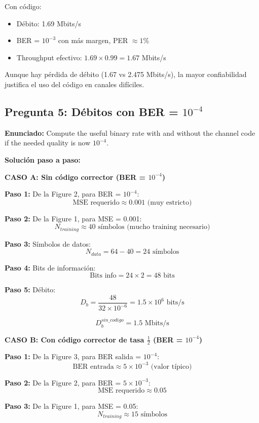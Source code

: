 \documentclass[11pt,a4paper]{article}
\begin{document}
Con c\'odigo:
\begin{itemize}
    \item D\'ebito: 1.69 Mbits/s
    \item BER = $10^{-3}$ con m\'as margen, PER $\approx 1\%$
    \item Throughput efectivo: $1.69 \times 0.99 = 1.67$ Mbits/s
\end{itemize}

Aunque hay p\'erdida de d\'ebito (1.67 vs 2.475 Mbits/s), la mayor confiabilidad justifica el uso del c\'odigo en canales dif\'iciles.



\subsection*{Pregunta 5: D\'ebitos con BER = $10^{-4}$}

\textbf{Enunciado:} Compute the useful binary rate with and without the channel code if the needed quality is now $10^{-4}$.

\vspace{0.3cm}
\textbf{Soluci\'on paso a paso:}

\textbf{CASO A: Sin c\'odigo corrector (BER = $10^{-4}$)}

\textbf{Paso 1:} De la Figure 2, para BER = $10^{-4}$:
\[
\text{MSE requerido} \approx 0.001 \text{ (muy estricto)}
\]

\textbf{Paso 2:} De la Figure 1, para MSE = 0.001:
\[
N_{training} \approx 40 \text{ s\'imbolos (mucho training necesario)}
\]

\textbf{Paso 3:} S\'imbolos de datos:
\[
N_{data} = 64 - 40 = 24 \text{ s\'imbolos}
\]

\textbf{Paso 4:} Bits de informaci\'on:
\[
\text{Bits info} = 24 \times 2 = 48 \text{ bits}
\]

\textbf{Paso 5:} D\'ebito:
\[
D_b = \frac{48}{32 \times 10^{-6}} = 1.5 \times 10^{6} \text{ bits/s}
\]

\[
\boxed{D_b^{sin\_codigo} = 1.5 \text{ Mbits/s}}
\]

\textbf{CASO B: Con c\'odigo corrector de tasa $\frac{1}{2}$ (BER = $10^{-4}$)}

\textbf{Paso 1:} De la Figure 3, para BER salida = $10^{-4}$:
\[
\text{BER entrada} \approx 5 \times 10^{-3} \text{ (valor t\'ipico)}
\]

\textbf{Paso 2:} De la Figure 2, para BER = $5 \times 10^{-3}$:
\[
\text{MSE requerido} \approx 0.05
\]

\textbf{Paso 3:} De la Figure 1, para MSE = 0.05:
\[
N_{training} \approx 15 \text{ s\'imbolos}
\]
\end{document}
